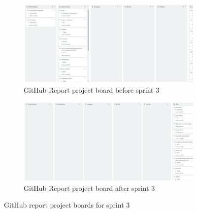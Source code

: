 \documentclass[10pt, notitlepage]{report}
\begin{document}
\begin{figure}[!h]
\centering
\begin{subfigure}{\textwidth}
	\centering	
	\includegraphics[width=1\linewidth]{git-report-3-before.png}
	\caption{GitHub Report project board before sprint 3}
	\label{fig:agileapp-rb3}
\end{subfigure}
\begin{subfigure}{\textwidth}
	\centering	
	\includegraphics[width=1\linewidth]{git-report-3-after.png}
	\caption{GitHub Report project board after sprint 3}
	\label{fig:agileapp-ra3}
\end{subfigure}

\caption{GitHub report project boards for sprint 3}

\end{figure}
\end{document}
